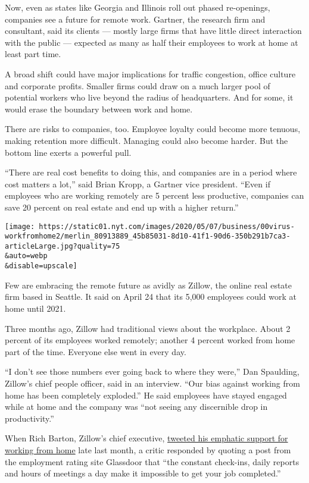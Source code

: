 Now, even as states like Georgia and Illinois roll out phased
re-openings, companies see a future for remote work. Gartner, the
research firm and consultant, said its clients --- mostly large firms
that have little direct interaction with the public --- expected as many
as half their employees to work at home at least part time.

A broad shift could have major implications for traffic congestion,
office culture and corporate profits. Smaller firms could draw on a much
larger pool of potential workers who live beyond the radius of
headquarters. And for some, it would erase the boundary between work and
home.

There are risks to companies, too. Employee loyalty could become more
tenuous, making retention more difficult. Managing could also become
harder. But the bottom line exerts a powerful pull.

``There are real cost benefits to doing this, and companies are in a
period where cost matters a lot,'' said Brian Kropp, a Gartner vice
president. ``Even if employees who are working remotely are 5 percent
less productive, companies can save 20 percent on real estate and end up
with a higher return.''

\texttt{[image: https://static01.nyt.com/images/2020/05/07/business/00virus-workfromhome2/merlin\_80913889\_45b85031-8d10-41f1-90d6-350b291b7ca3-articleLarge.jpg?quality=75\\\&auto=webp\\\&disable=upscale]}

Few are embracing the remote future as avidly as Zillow, the online real
estate firm based in Seattle. It said on April 24 that its 5,000
employees could work at home until 2021.

Three months ago, Zillow had traditional views about the workplace.
About 2 percent of its employees worked remotely; another 4 percent
worked from home part of the time. Everyone else went in every day.

``I don't see those numbers ever going back to where they were,'' Dan
Spaulding, Zillow's chief people officer, said in an interview. ``Our
bias against working from home has been completely exploded.'' He said
employees have stayed engaged while at home and the company was ``not
seeing any discernible drop in productivity.''

When Rich Barton, Zillow's chief executive,
\href{https://twitter.com/Rich_Barton/status/1254187509459742720}{tweeted
his emphatic support for working from home} late last month, a critic
responded by quoting a post from the employment rating site Glassdoor
that ``the constant check-ins, daily reports and hours of meetings a day
make it impossible to get your job completed.''

